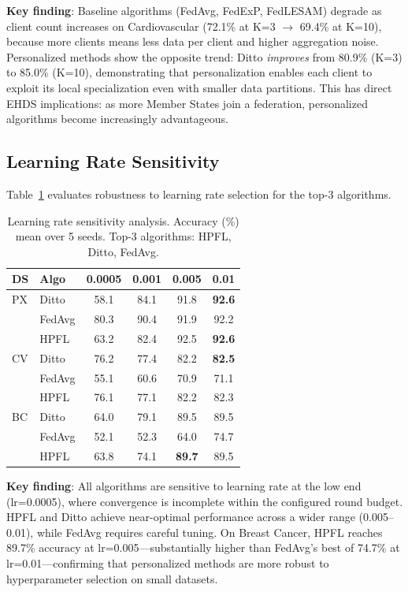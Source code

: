 \documentclass[conference]{IEEEtran}
\begin{document}
\textbf{Key finding}: Baseline algorithms (FedAvg, FedExP, FedLESAM) degrade as client count increases on Cardiovascular (72.1\% at K=3 $\to$ 69.4\% at K=10), because more clients means less data per client and higher aggregation noise. Personalized methods show the opposite trend: Ditto \textit{improves} from 80.9\% (K=3) to 85.0\% (K=10), demonstrating that personalization enables each client to exploit its local specialization even with smaller data partitions. This has direct EHDS implications: as more Member States join a federation, personalized algorithms become increasingly advantageous.

\subsection{Learning Rate Sensitivity}

Table~\ref{tab:lr_sensitivity} evaluates robustness to learning rate selection for the top-3 algorithms.

\begin{table}[t]
\centering
\caption{Learning rate sensitivity analysis. Accuracy (\%) mean over 5 seeds. Top-3 algorithms: HPFL, Ditto, FedAvg.}
\label{tab:lr_sensitivity}
\small
\begin{tabular}{llcccc}
\toprule
\textbf{DS} & \textbf{Algo} & \textbf{0.0005} & \textbf{0.001} & \textbf{0.005} & \textbf{0.01} \\
\midrule
PX & Ditto & 58.1 & 84.1 & 91.8 & \textbf{92.6} \\
 & FedAvg & 80.3 & 90.4 & 91.9 & 92.2 \\
 & HPFL & 63.2 & 82.4 & 92.5 & \textbf{92.6} \\
\midrule
CV & Ditto & 76.2 & 77.4 & 82.2 & \textbf{82.5} \\
 & FedAvg & 55.1 & 60.6 & 70.9 & 71.1 \\
 & HPFL & 76.1 & 77.1 & 82.2 & 82.3 \\
\midrule
BC & Ditto & 64.0 & 79.1 & 89.5 & 89.5 \\
 & FedAvg & 52.1 & 52.3 & 64.0 & 74.7 \\
 & HPFL & 63.8 & 74.1 & \textbf{89.7} & 89.5 \\
\bottomrule
\end{tabular}
\end{table}

\textbf{Key finding}: All algorithms are sensitive to learning rate at the low end (lr=0.0005), where convergence is incomplete within the configured round budget. HPFL and Ditto achieve near-optimal performance across a wider range (0.005--0.01), while FedAvg requires careful tuning. On Breast Cancer, HPFL reaches 89.7\% accuracy at lr=0.005---substantially higher than FedAvg's best of 74.7\% at lr=0.01---confirming that personalized methods are more robust to hyperparameter selection on small datasets.
\end{document}

